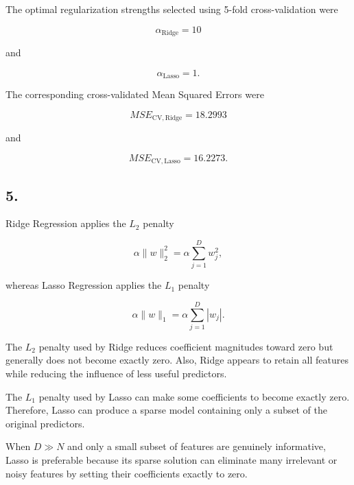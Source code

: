 \documentclass[11pt]{article}
\begin{document}
    The optimal regularization strengths selected using 5-fold
cross-validation were

\[
\alpha_{\mathrm{Ridge}} = \text{10}
\]

and

\[
\alpha_{\mathrm{Lasso}} = \text{1}.
\]

The corresponding cross-validated Mean Squared Errors were

\[
MSE_{\mathrm{CV,Ridge}} = \text{18.2993}
\]

and

\[
MSE_{\mathrm{CV,Lasso}} = \text{16.2273}.
\]

    \subsection{5.}

Ridge Regression applies the \(L_2\) penalty

\[
\alpha \lVert w\rVert_2^2
=
\alpha\sum_{j=1}^{D}w_j^2,
\]

whereas Lasso Regression applies the \(L_1\) penalty

\[
\alpha\lVert w\rVert_1
=
\alpha\sum_{j=1}^{D}|w_j|.
\]

The \(L_2\) penalty used by Ridge reduces coefficient magnitudes toward
zero but generally does not become exactly zero. Also, Ridge appears to
retain all features while reducing the influence of less useful
predictors.

The \(L_1\) penalty used by Lasso can make some coefficients to become
exactly zero. Therefore, Lasso can produce a sparse model containing
only a subset of the original predictors.

When \(D \gg N\) and only a small subset of features are genuinely
informative, Lasso is preferable because its sparse solution can
eliminate many irrelevant or noisy features by setting their
coefficients exactly to zero.
\end{document}

